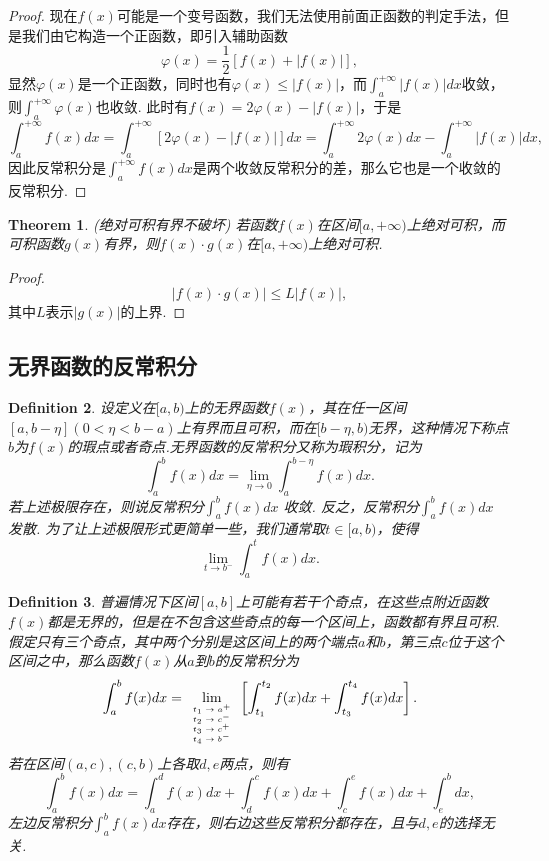 \documentclass{article}
\newtheorem{theorem}{Theorem}[section]
\newtheorem{definition}[theorem]{Definition}
\begin{document}
\begin{proof}
{\color{blue}现在$f(x)$可能是一个变号函数，我们无法使用前面正函数的判定手法，但是我们由它构造一个正函数}，即引入辅助函数
$$
\varphi(x) = \frac{1}{2}\left[f(x) + |f(x)|\right],
$$
显然$\varphi(x)$是一个正函数，同时也有$\varphi(x) \leq |f(x)|$，而$\int_a^{+\infty} |f(x)|dx$收敛，则$\int_a^{+\infty} \varphi(x)$也收敛. 此时有$f(x) = 2\varphi(x) - |f(x)|$，于是
$$
\int_a^{+\infty} f(x)dx = \int_a^{+\infty} \left[2\varphi(x) - |f(x)| \right] dx=  \int_a^{+\infty} 2\varphi(x)dx - \int_a^{+\infty} |f(x)|dx,
$$ 
因此反常积分是$\int_a^{+\infty} f(x)dx$是两个收敛反常积分的差，那么它也是一个收敛的反常积分. 
\end{proof}

\begin{theorem}
\rm {\color{red} (绝对可积有界不破坏)} 若函数$f(x)$在区间$[a,+\infty)$上绝对可积，而可积函数$g(x)$有界，则$f(x)\cdot g(x)$在$[a,+\infty)$上绝对可积.
\end{theorem}

\begin{proof}
$$
|f(x)\cdot g(x)| \leq L|f(x)|,
$$
其中$L$表示$|g(x)|$的上界. 
\end{proof}

\subsection{无界函数的反常积分}


\begin{definition}
\rm 设定义在$[a,b)$上的无界函数$f(x)$，其在任一区间$[a,b-\eta](0 < \eta < b-a)$上有界而且可积，而在$[b-\eta,b)$无界，这种情况下称点$b$为$f(x)$的{\color{red}瑕点}或者{\color{red}奇点}.无界函数的反常积分又称为{\color{red}瑕积分}，记为
$$
\int_a^b f(x)dx = \lim\limits_{\eta \rightarrow 0} \int_a^{b-\eta} f(x)dx.
$$
若上述极限存在，则说反常积分$\int_a^b f(x)dx$ {\color{red}收敛}. 反之，反常积分$\int_a^b f(x)dx$ {\color{red}发散}. 为了让上述极限形式更简单一些，我们通常取$t \in [a,b)$，使得
$$
\lim\limits_{t \rightarrow b^{-}}\int_a^t f(x)dx.
$$
\end{definition}

\begin{definition}
\rm {\color{red}普遍情况下区间$[a,b]$上可能有若干个奇点}，在这些点附近函数$f(x)$都是无界的，但是在不包含这些奇点的每一个区间上，函数都有界且可积. 假定只有三个奇点，其中两个分别是这区间上的两个端点$a$和$b$，第三点$c$位于这个区间之中，那么函数$f(x)$从$a$到$b$的反常积分为
$$
\int_a^b f(x)dx = \lim\limits_{\mbox{\tiny$\begin{array}{ll}
t_1 \rightarrow	 a^+ \\
t_2 \rightarrow  c^- \\
t_3 \rightarrow  c^+ \\
t_4 \rightarrow  b^- \\
\end{array}$}} \left[ \int_{t_1}^{t_2}f(x)dx + \int_{t_3}^{t_4} f(x)dx \right].
$$
若在区间$(a,c),(c,b)$上各取$d,e$两点，则有
$$
\int_a^b f(x)dx  = \int_a^d f(x)dx + \int_d^c f(x)dx + \int_c^e f(x)dx + \int_e^b dx, 
$$
左边反常积分$\int_a^b f(x)dx$存在，则右边这些反常积分都存在，且与$d,e$的选择无关. 
\end{definition}
\end{document}
